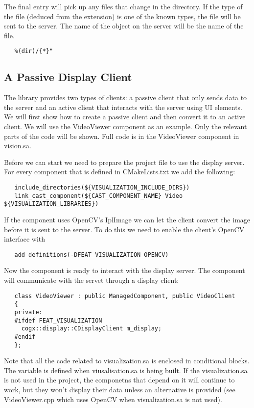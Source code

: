 The final entry will pick up any files that change in the directory. If the
type of the file (deduced from the extension) is one of the known types, the
file will be sent to the server. The name of the object on the server will be
the name of the file.

\begin{verbatim}
   %(dir)/{*}"
\end{verbatim}

\subsection{A Passive Display Client}

The library provides two types of clients: a passive client that only sends
data to the server and an active client that interacts with the server using UI
elements. We will first show how to create a passive client and then convert it
to an active client. We will use the VideoViewer component as an example. Only
the relevant parts of the code will be shown. Full code is in the VideoViewer
component in vision.sa.

Before we can start we need to prepare the project file to use the display server.
For every component that is defined in CMakeLists.txt we add the following:

\begin{verbatim}
   include_directories(${VISUALIZATION_INCLUDE_DIRS})
   link_cast_component(${CAST_COMPONENT_NAME} Video ${VISUALIZATION_LIBRARIES})
\end{verbatim}

If the component uses OpenCV's IplImage we can let the client convert the image
before it is sent to the server. To do this we need to enable the client's OpenCV
interface with

\begin{verbatim}
   add_definitions(-DFEAT_VISUALIZATION_OPENCV)
\end{verbatim}

Now the component is ready to interact with the display server. The component
will communicate with the servet through a display client:

\begin{verbatim}
   class VideoViewer : public ManagedComponent, public VideoClient
   {
   private:
   #ifdef FEAT_VISUALIZATION
     cogx::display::CDisplayClient m_display;
   #endif
   };
\end{verbatim}

Note that all the code related to visualization.sa is enclosed in conditional
blocks. The variable  is defined when
viusalisation.sa is being built. If the visualization.sa is not used in the
project, the componetns that depend on it will continue to work, but they won't
display their data unless an alternative is provided (see VideoViewer.cpp which
uses OpenCV when visualization.sa is not used).


